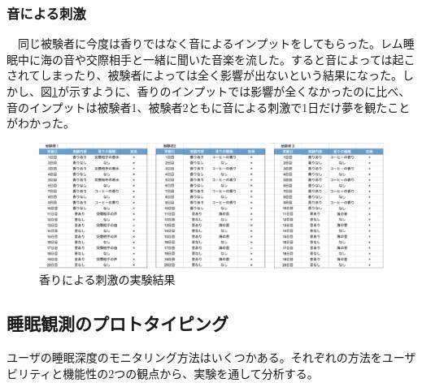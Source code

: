 \subsubsection{音による刺激}
　同じ被験者に今度は香りではなく音によるインプットをしてもらった。レム睡眠中に海の音や交際相手と一緒に聞いた音楽を流した。すると音によっては起こされてしまったり、被験者によっては全く影響が出ないという結果になった。しかし、図\ref{smellExperiment}が示すように、香りのインプットでは影響が全くなかったのに比べ、音のインプットは被験者1、被験者2ともに音による刺激で1日だけ夢を観たことがわかった。

\begin{figure}[htbp]
\begin{center}
\includegraphics[width=15cm]{eps/smellExperiment.eps}
\caption{香りによる刺激の実験結果}
\label{smellExperiment}
\end{center}
\end{figure}

\subsection{睡眠観測のプロトタイピング}
ユーザの睡眠深度のモニタリング方法はいくつかある。それぞれの方法をユーザビリティと機能性の2つの観点から、実験を通して分析する。

